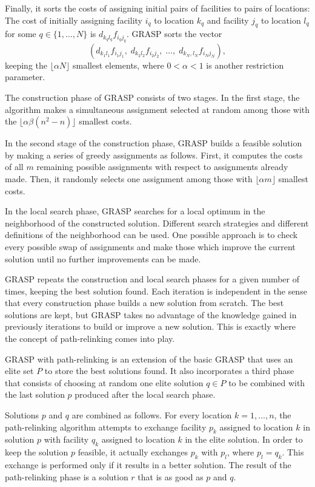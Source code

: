 \documentclass[english]{lni}
\begin{document}
Finally, it sorts the costs of assigning initial pairs of facilities to pairs
of locations: The cost of initially assigning facility $i_q$ to location $k_q$
and facility $j_q$ to location $l_q$
for some $q\in\{1,\ldots,N\}$ is $d_{k_q l_q} f_{i_q j_q}$. GRASP sorts
the vector
\begin{displaymath}
(d_{k_1 l_1}  f_{i_1 j_1},\;
d_{k_2 l_2}  f_{i_2 j_2},\; \ldots,\;
d_{k_N, l_N}  f_{i_N j_N}),
\end{displaymath}
keeping the $\lfloor \alpha N \rfloor$ smallest elements, where $0 < \alpha <
1$ is another restriction parameter.

The construction phase of GRASP consists of two stages. In the first stage,
the algorithm makes a simultaneous assignment selected at random among those
with the $\lfloor \alpha \beta (n^2 - n) \rfloor$ smallest costs.

In the second stage of the construction phase, GRASP builds a feasible
solution by making a series of greedy assignments as follows. First, it
computes the costs of all $m$ remaining possible assignments with respect to
assignments already made. Then, it randomly selects one assignment among those
with $\lfloor \alpha m \rfloor$ smallest costs.

In the local search phase, GRASP searches for a local optimum in the
neighborhood of the constructed solution. Different search strategies and
different definitions of the neighborhood can be used. One possible approach is
to check every possible swap of assignments and make those which improve the
current solution until no further improvements can be made.

GRASP repeats the construction and local search phases for a given number of
times, keeping the best solution found. Each iteration is independent in the
sense that every construction phase builds a new solution from scratch. The best
solutions are kept, but GRASP takes no advantage of the knowledge gained in
previously iterations to build or improve a new solution. This is exactly where
the concept of path-relinking comes into play.

GRASP with path-relinking is an extension of the basic GRASP that uses an elite
set $P$ to store the best solutions found. It also incorporates a third phase
that consists of choosing at random one elite solution $q \in P$  to be combined
with the last solution $p$ produced after the local search phase.

Solutions $p$ and $q$ are combined as follows. For every location
$k = 1, \ldots, n$, the path-relinking algorithm attempts to exchange facility
$p_k$ assigned to location $k$ in  solution $p$ with facility $q_k$ assigned to
location $k$ in the elite solution. In order to keep the solution $p$ feasible,
it actually exchanges $p_k$ with $p_l$, where $p_l = q_k$. This exchange is
performed only if it results in a better solution. The result of the
path-relinking phase is a solution $r$ that is as good as $p$ and $q$.
\end{document}
